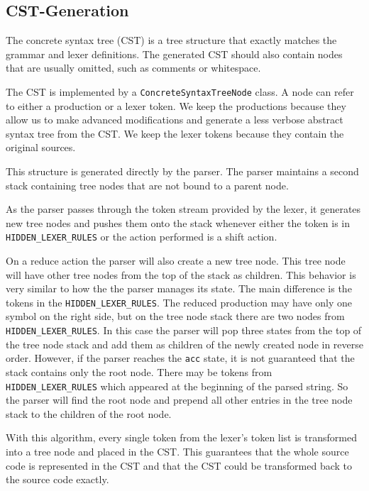 \subsection{CST-Generation}
The concrete syntax tree (CST) is a tree structure that exactly matches the grammar and lexer definitions. 
The generated CST should also contain nodes that are usually omitted, such as comments or whitespace.

The CST is implemented by a \verb|ConcreteSyntaxTreeNode| class. 
A node can refer to either a production or a lexer token. 
We keep the productions because they allow us to make advanced modifications and generate a less verbose abstract syntax tree from the CST. 
We keep the lexer tokens because they contain the original sources.

This structure is generated directly by the parser. 
The parser maintains a second stack containing tree nodes that are not bound to a parent node.

As the parser passes through the token stream provided by the lexer, 
it generates new tree nodes and pushes them onto the stack whenever either the token is in \verb|HIDDEN_LEXER_RULES| or the action performed is a shift action. 

On a reduce action the parser will also create a new tree node. 
This tree node will have other tree nodes from the top of the stack as children. 
This behavior is very similar to how the the parser manages its state. 
The main difference is the tokens in the \verb|HIDDEN_LEXER_RULES|. 
The reduced production may have only one symbol on the right side, but on the tree node stack there are two nodes from \verb|HIDDEN_LEXER_RULES|. 
In this case the parser will pop three states from the top of the tree node stack and add them as children of the newly created node in reverse order. 
However, if the parser reaches the \verb|acc| state, it is not guaranteed that the stack contains only the root node. 
There may be tokens from \verb|HIDDEN_LEXER_RULES| which appeared at the beginning of the parsed string. 
So the parser will find the root node and prepend all other entries in the tree node stack to the children of the root node. 

With this algorithm, every single token from the lexer's token list is transformed into a tree node and placed in the CST. 
This guarantees that the whole source code is represented in the CST and that the CST could be transformed back to the source code exactly.

